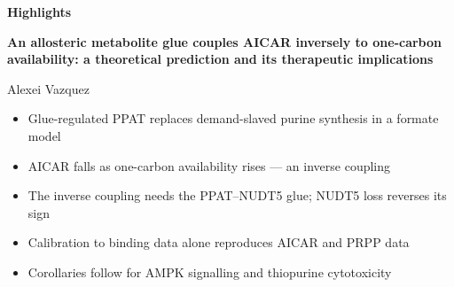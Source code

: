 \documentclass[11pt]{article}
\begin{document}
\begin{center}
{\Large\textbf{Highlights}}
\end{center}

\bigskip

\noindent\textbf{An allosteric metabolite glue couples AICAR inversely to
one-carbon availability: a theoretical prediction and its therapeutic
implications}

\medskip

\noindent Alexei Vazquez

\bigskip

\begin{itemize}[leftmargin=1.5em,itemsep=0.5em]
\item Glue-regulated PPAT replaces demand-slaved purine synthesis in a formate model
\item AICAR falls as one-carbon availability rises --- an inverse coupling
\item The inverse coupling needs the PPAT--NUDT5 glue; NUDT5 loss reverses its sign
\item Calibration to binding data alone reproduces AICAR and PRPP data
\item Corollaries follow for AMPK signalling and thiopurine cytotoxicity
\end{itemize}
\end{document}
